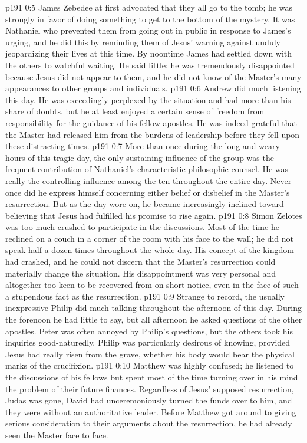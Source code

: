 \vs p191 0:5 James Zebedee at first advocated that they all go to the tomb; he was strongly in favor of doing something to get to the bottom of the mystery. It was Nathaniel who prevented them from going out in public in response to James’s urging, and he did this by reminding them of Jesus’ warning against unduly jeopardizing their lives at this time. By noontime James had settled down with the others to watchful waiting. He said little; he was tremendously disappointed because Jesus did not appear to them, and he did not know of the Master’s many appearances to other groups and individuals.
\vs p191 0:6 Andrew did much listening this day. He was exceedingly perplexed by the situation and had more than his share of doubts, but he at least enjoyed a certain sense of freedom from responsibility for the guidance of his fellow apostles. He was indeed grateful that the Master had released him from the burdens of leadership before they fell upon these distracting times.
\vs p191 0:7 More than once during the long and weary hours of this tragic day, the only sustaining influence of the group was the frequent contribution of Nathaniel’s characteristic philosophic counsel. He was really the controlling influence among the ten throughout the entire day. Never once did he express himself concerning either belief or disbelief in the Master’s resurrection. But as the day wore on, he became increasingly inclined toward believing that Jesus had fulfilled his promise to rise again.
\vs p191 0:8 Simon Zelotes was too much crushed to participate in the discussions. Most of the time he reclined on a couch in a corner of the room with his face to the wall; he did not speak half a dozen times throughout the whole day. His concept of the kingdom had crashed, and he could not discern that the Master’s resurrection could materially change the situation. His disappointment was very personal and altogether too keen to be recovered from on short notice, even in the face of such a stupendous fact as the resurrection.
\vs p191 0:9 Strange to record, the usually inexpressive Philip did much talking throughout the afternoon of this day. During the forenoon he had little to say, but all afternoon he asked questions of the other apostles. Peter was often annoyed by Philip’s questions, but the others took his inquiries good\hyp{}naturedly. Philip was particularly desirous of knowing, provided Jesus had really risen from the grave, whether his body would bear the physical marks of the crucifixion.
\vs p191 0:10 Matthew was highly confused; he listened to the discussions of his fellows but spent most of the time turning over in his mind the problem of their future finances. Regardless of Jesus’ supposed resurrection, Judas was gone, David had unceremoniously turned the funds over to him, and they were without an authoritative leader. Before Matthew got around to giving serious consideration to their arguments about the resurrection, he had already seen the Master face to face.
